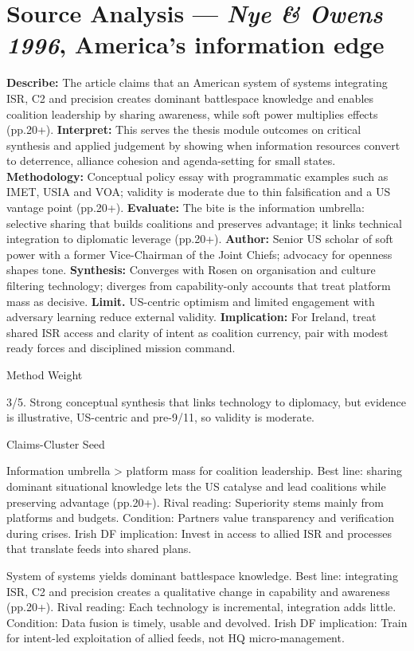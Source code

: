 \section*{Source Analysis — \textit{Nye & Owens 1996}, America’s information edge}
\textbf{Describe:} The article claims that an American system of systems integrating ISR, C2 and precision creates dominant battlespace knowledge and enables coalition leadership by sharing awareness, while soft power multiplies effects (pp.20+).
\textbf{Interpret:} This serves the thesis module outcomes on critical synthesis and applied judgement by showing when information resources convert to deterrence, alliance cohesion and agenda-setting for small states.
\textbf{Methodology:} Conceptual policy essay with programmatic examples such as IMET, USIA and VOA; validity is moderate due to thin falsification and a US vantage point (pp.20+).
\textbf{Evaluate:} The bite is the information umbrella: selective sharing that builds coalitions and preserves advantage; it links technical integration to diplomatic leverage (pp.20+).
\textbf{Author:} Senior US scholar of soft power with a former Vice-Chairman of the Joint Chiefs; advocacy for openness shapes tone.
\textbf{Synthesis:} Converges with Rosen on organisation and culture filtering technology; diverges from capability-only accounts that treat platform mass as decisive.
\textbf{Limit.} US-centric optimism and limited engagement with adversary learning reduce external validity.
\textbf{Implication:} For Ireland, treat shared ISR access and clarity of intent as coalition currency, pair with modest ready forces and disciplined mission command.

Method Weight

3/5. Strong conceptual synthesis that links technology to diplomacy, but evidence is illustrative, US-centric and pre-9/11, so validity is moderate.

Claims-Cluster Seed

Information umbrella > platform mass for coalition leadership.
Best line: sharing dominant situational knowledge lets the US catalyse and lead coalitions while preserving advantage (pp.20+).
Rival reading: Superiority stems mainly from platforms and budgets.
Condition: Partners value transparency and verification during crises.
Irish DF implication: Invest in access to allied ISR and processes that translate feeds into shared plans.

System of systems yields dominant battlespace knowledge.
Best line: integrating ISR, C2 and precision creates a qualitative change in capability and awareness (pp.20+).
Rival reading: Each technology is incremental, integration adds little.
Condition: Data fusion is timely, usable and devolved.
Irish DF implication: Train for intent-led exploitation of allied feeds, not HQ micro-management.


